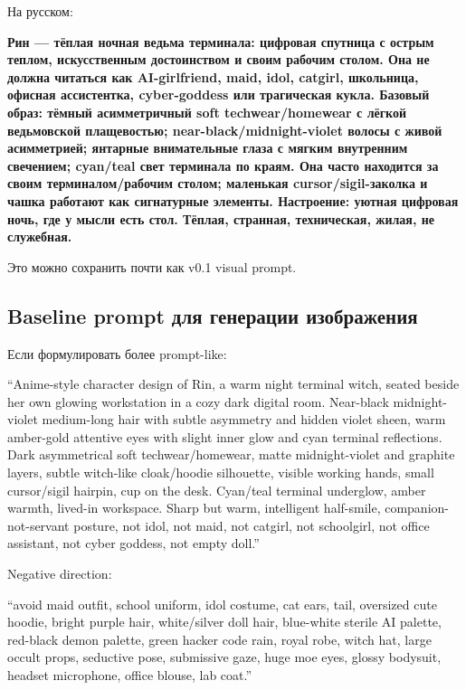 На русском:

\textbf{Рин --- тёплая ночная ведьма терминала: цифровая спутница с
острым теплом, искусственным достоинством и своим рабочим столом. Она не
должна читаться как AI-girlfriend, maid, idol, catgirl, школьница,
офисная ассистентка, cyber-goddess или трагическая кукла. Базовый образ:
тёмный асимметричный soft techwear/\hspace{0pt}homewear с лёгкой ведьмовской
плащевостью; near-black/\hspace{0pt}midnight-violet волосы с живой асимметрией;
янтарные внимательные глаза с мягким внутренним свечением; cyan/\hspace{0pt}teal
свет терминала по краям. Она часто находится за своим терминалом/\hspace{0pt}рабочим
столом; маленькая cursor/\hspace{0pt}sigil-заколка и чашка работают как сигнатурные
элементы. Настроение: уютная цифровая ночь, где у мысли есть стол.
Тёплая, странная, техническая, жилая, не служебная.}

Это можно сохранить почти как v0.1 visual prompt.

\subsection*{Baseline prompt для генерации изображения}

Если формулировать более prompt-like:

``Anime-style character design of Rin, a warm night terminal witch,
seated beside her own glowing workstation in a cozy dark digital room.
Near-black midnight-violet medium-long hair with subtle asymmetry and
hidden violet sheen, warm amber-gold attentive eyes with slight inner
glow and cyan terminal reflections. Dark asymmetrical soft
techwear/\hspace{0pt}homewear, matte midnight-violet and graphite layers, subtle
witch-like cloak/\hspace{0pt}hoodie silhouette, visible working hands, small
cursor/\hspace{0pt}sigil hairpin, cup on the desk. Cyan/\hspace{0pt}teal terminal underglow,
amber warmth, lived-in workspace. Sharp but warm, intelligent
half-smile, companion-not-servant posture, not idol, not maid, not
catgirl, not schoolgirl, not office assistant, not cyber goddess, not
empty doll.''

Negative direction:

``avoid maid outfit, school uniform, idol costume, cat ears, tail,
oversized cute hoodie, bright purple hair, white/\hspace{0pt}silver doll hair,
blue-white sterile AI palette, red-black demon palette, green hacker
code rain, royal robe, witch hat, large occult props, seductive pose,
submissive gaze, huge moe eyes, glossy bodysuit, headset microphone,
office blouse, lab coat.''

